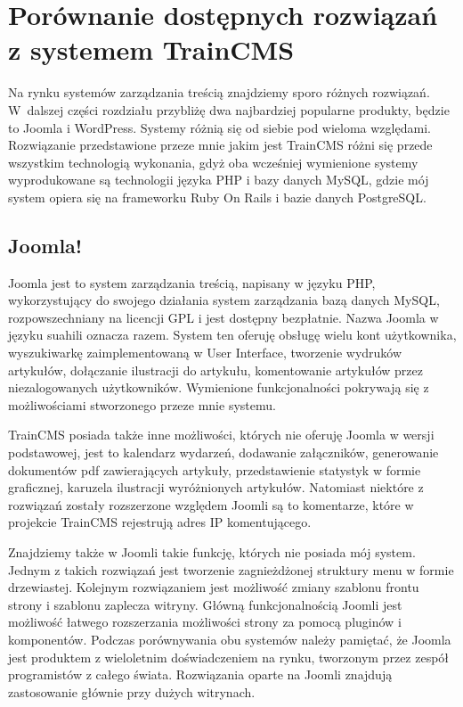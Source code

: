 \documentclass[openright]{xmgr}
\begin{document}
\section{Porównanie dostępnych rozwiązań z systemem TrainCMS}

Na rynku systemów zarządzania treścią znajdziemy sporo różnych rozwiązań. W~dalszej części rozdziału przybliżę dwa najbardziej popularne produkty, będzie to Joomla i WordPress. Systemy różnią się od siebie pod wieloma względami. Rozwiązanie przedstawione przeze mnie jakim jest TrainCMS różni się  przede wszystkim technologią wykonania, gdyż oba wcześniej wymienione systemy wyprodukowane są technologii języka PHP i bazy danych MySQL, gdzie mój system opiera się na frameworku Ruby On Rails i bazie danych PostgreSQL.

\subsection{Joomla!}

Joomla jest to system zarządzania treścią, napisany w języku PHP, wykorzystujący do swojego działania system zarządzania bazą danych MySQL, rozpowszechniany na licencji GPL i jest dostępny bezpłatnie. Nazwa Joomla w języku suahili oznacza razem.   
System ten oferuję obsługę wielu kont użytkownika, wyszukiwarkę zaimplementowaną w User Interface, tworzenie wydruków artykułów, dołączanie ilustracji do artykułu, komentowanie artykułów przez niezalogowanych użytkowników. Wymienione funkcjonalności pokrywają się z możliwościami stworzonego przeze mnie systemu. 

TrainCMS posiada także inne możliwości, których nie oferuję Joomla w wersji podstawowej, jest to kalendarz wydarzeń, dodawanie załączników, generowanie dokumentów pdf zawierających artykuły, przedstawienie statystyk w formie graficznej, karuzela ilustracji wyróżnionych artykułów. Natomiast niektóre z rozwiązań zostały rozszerzone względem Joomli są to komentarze, które w projekcie TrainCMS rejestrują adres IP komentującego. 

Znajdziemy także w Joomli takie funkcję, których nie posiada mój system. Jednym z takich rozwiązań jest tworzenie zagnieżdżonej struktury menu w formie drzewiastej. Kolejnym rozwiązaniem jest możliwość zmiany szablonu frontu strony i szablonu zaplecza witryny. Główną funkcjonalnością Joomli jest możliwość łatwego rozszerzania możliwości strony za pomocą pluginów i komponentów. Podczas porównywania obu systemów należy pamiętać, że Joomla jest produktem z wieloletnim doświadczeniem na rynku, tworzonym przez zespół programistów z całego świata. Rozwiązania oparte na Joomli znajdują zastosowanie głównie przy dużych witrynach.
\end{document}
